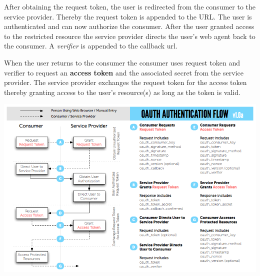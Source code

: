 After obtaining the request token, the user is redirected from the
consumer to the service provider. Thereby the request token is
appended to the URL. The user is authenticated and can now
authorize the consumer. After the user granted access to the
restricted resource the service provider directs the user's web
agent back to the consumer. A \emph{verifier} is appended to the
callback url.

When the user returns to the consumer the consumer uses request
token and verifier to request an \textbf{access token} and the
associated secret from the service provider. The service provider
exchanges the request token for the access token thereby granting
access to the user's resource(s) as long as the token is valid.

	\includegraphics[resolution=100]{../oauth_diagram.png}	
